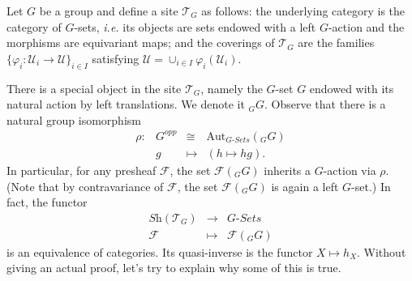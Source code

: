 \noindent
Let $G$ be a group and define a site $\mathcal{T}_G$ as follows: the underlying 
category is the category of $G$-sets, {\it i.e.} its objects are sets endowed 
with a left $G$-action and the morphisms are equivariant maps; and the 
coverings of $\mathcal{T}_G$ are the families $\{\varphi_i : \mathcal{U}_i \to 
\mathcal{U} \}_{i\in I}$ satisfying $\mathcal{U} = \cup_{i\in I} \varphi_i 
(\mathcal{U}_i)$. 

\medskip\noindent
There is a special object in the site $\mathcal{T}_G$, namely the $G$-set $G$ 
endowed with its natural action by left translations. We denote it ${}_G G$. 
Observe that there is a natural group isomorphism
$$
\begin{matrix}
\rho: & G^{opp} & \cong & \text{Aut}_{G\textit{-Sets}}({}_G G) \\
& g & \longmapsto & (h \mapsto hg).
\end{matrix}
$$
In particular, for any presheaf $\mathcal{F}$, the set $\mathcal{F}({}_G G)$  
inherits a $G$-action via $\rho$. (Note that by contravariance of 
$\mathcal{F}$, the set $\mathcal{F}({}_G G)$ is again a left $G$-set.) In fact, 
the functor 
$$
\begin{matrix}
\textit{Sh}(\mathcal{T}_G) & \longrightarrow & G\textit{-Sets} \\
\mathcal{F} & \longmapsto & \mathcal{F}({}_G G)
\end{matrix}
$$
is an equivalence of categories. Its quasi-inverse is the functor $X \mapsto 
h_X$. Without giving an actual proof, let's try to explain why some of this is 
true.
